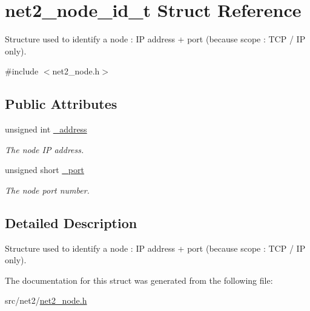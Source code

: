 \hypertarget{structnet2__node__id__t}{\section{net2\-\_\-node\-\_\-id\-\_\-t Struct Reference}
\label{structnet2__node__id__t}
}


Structure used to identify a node \-: I\-P address + port (because scope \-: T\-C\-P / I\-P only).  




{\ttfamily \#include $<$net2\-\_\-node.\-h$>$}

\subsection*{Public Attributes}
\begin{DoxyCompactItemize}
\item 
\hypertarget{structnet2__node__id__t_a99c44d35c43abc24127fcee951ae1283}{unsigned int \hyperlink{structnet2__node__id__t_a99c44d35c43abc24127fcee951ae1283}{\-\_\-address}}\label{structnet2__node__id__t_a99c44d35c43abc24127fcee951ae1283}

\begin{DoxyCompactList}\small\item\em The node I\-P address. \end{DoxyCompactList}\item 
\hypertarget{structnet2__node__id__t_a3e5d37dee3738ed77b761c86479f5d23}{unsigned short \hyperlink{structnet2__node__id__t_a3e5d37dee3738ed77b761c86479f5d23}{\-\_\-port}}\label{structnet2__node__id__t_a3e5d37dee3738ed77b761c86479f5d23}

\begin{DoxyCompactList}\small\item\em The node port number. \end{DoxyCompactList}\end{DoxyCompactItemize}


\subsection{Detailed Description}
Structure used to identify a node \-: I\-P address + port (because scope \-: T\-C\-P / I\-P only). 

The documentation for this struct was generated from the following file\-:\begin{DoxyCompactItemize}
\item 
src/net2/\hyperlink{net2__node_8h}{net2\-\_\-node.\-h}\end{DoxyCompactItemize}
